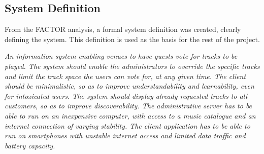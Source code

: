 \subsection{System Definition}\label{sub:systemDefinition}
From the FACTOR analysis, a formal system definition was created,
clearly defining the system. This definition is used as the basis for
the rest of the project.

\begin{center}
\textit{An information system enabling venues to have guests vote for tracks to be played. The system should enable the administrators to override the specific tracks and limit the track space the users can vote for, at any given time. The client should be minimalistic, so as to improve understandability and learnability, even for intoxicated users. The system should display already requested tracks to all customers, so as to improve discoverability.
The administrative server has to be able to run on an inexpensive computer, with access to a music catalogue and an internet connection of varying stability. The client application has to be able to run on smartphones with unstable internet access and limited data traffic and battery capacity.}
\end{center}
